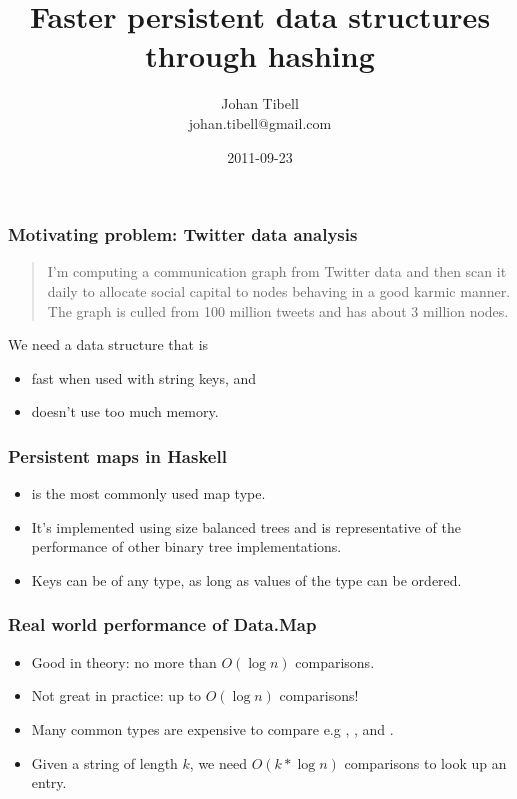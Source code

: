 \documentclass[xetex,mathserif,serif]{beamer}
\title{Faster persistent data structures through hashing}
\author{Johan Tibell\\johan.tibell@gmail.com}
\date{2011-09-23}
\newcommand{\code}[1]{\mbox{\texttt{\small{\color{CodeColor}{#1}}}}}
\begin{document}

\frame{\titlepage}

\begin{frame}
  \frametitle{Motivating problem: Twitter data analysis}

  \begin{quote}
    I'm computing a communication graph from Twitter data and then
    scan it daily to allocate social capital to nodes behaving in a
    good karmic manner.  The graph is culled from 100 million tweets
    and has about 3 million nodes.
  \end{quote}

  \bigskip
  We need a data structure that is
  \begin{itemize}
  \item fast when used with string keys, and
  \item doesn't use too much memory.
  \end{itemize}
\end{frame}

\begin{frame}
  \frametitle{Persistent maps in Haskell}

  \begin{itemize}
  \item \code{Data.Map} is the most commonly used map type.
  \item It's implemented using size balanced trees and is
    representative of the performance of other binary tree
    implementations.
  \item Keys can be of any type, as long as values of the type can be
    ordered.
  \end{itemize}
\end{frame}

\begin{frame}
  \frametitle{Real world performance of Data.Map}

  \begin{itemize}
  \item Good in theory: no more than $O(\log n)$ comparisons.
  \item Not great in practice: up to $O(\log n)$ comparisons!
  \item Many common types are expensive to compare e.g
    \code{String}, \code{ByteString}, and \code{Text}.
  \item Given a string of length $k$, we need $O(k*\log n)$
    comparisons to look up an entry.
  \end{itemize}
\end{frame}
\end{document}
